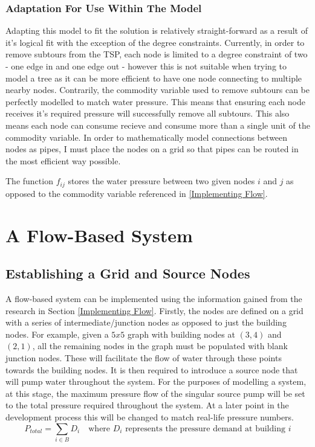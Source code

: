 \subsubsection{Adaptation For Use Within The Model}
Adapting this model to fit the solution is relatively straight-forward as a result of it's logical fit with the exception of the degree constraints. Currently, in order to remove subtours from the TSP, each node is limited to a degree constraint of two - one edge in and one edge out - however this is not suitable when trying to model a tree as it can be more efficient to have one node connecting to multiple nearby nodes.\newline\newline
Contrarily, the commodity variable used to remove subtours can be perfectly modelled to match water pressure. This means that ensuring each node receives it's required pressure will successfully remove all subtours. This also means each node can consume recieve and consume more than a single unit of the commodity variable. In order to mathematically model connections between nodes as pipes, I must place the nodes on a grid so that pipes can be routed in the most efficient way possible.


The function $f_{ij}$ stores the water pressure between two given nodes $i$ and $j$ as opposed to the commodity variable referenced in \ref{Implementing Flow}.

\section{A Flow-Based System}\label{A Flow-Based System}
\subsection{Establishing a Grid and Source Nodes}
A flow-based system can be implemented using the information gained from the research in Section \ref{Implementing Flow}. Firstly, the nodes are defined on a grid with a series of intermediate/junction nodes as opposed to just the building nodes. For example, given a $5x5$ graph with building nodes at $(3,4)$ and $(2,1)$, all the remaining nodes in the graph must be populated with blank junction nodes. These will facilitate the flow of water through these points towards the building nodes.\newline
It is then required to introduce a source node that will pump water throughout the system. For the purposes of modelling a system, at this stage, the maximum pressure flow of the singular source pump will be set to the total pressure required throughout the system. At a later point in the development process this will be changed to match real-life pressure numbers.
\[
P_{total}= \sum_{i\in B}D_i \quad\text{where $D_i$ represents the pressure demand at building $i$}
\]
